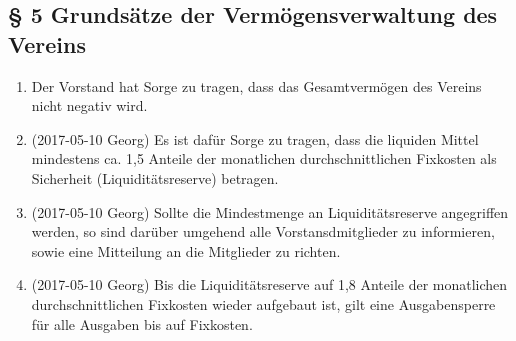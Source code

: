 \documentclass[10pt,a4paper]{article}
\begin{document}
\subsection*{§ 5 Grundsätze der Vermögensverwaltung des Vereins}
\begin{enumerate}
\item Der Vorstand hat Sorge zu tragen, dass das Gesamtvermögen des Vereins nicht negativ wird.
\item (2017-05-10 Georg) Es ist dafür Sorge zu tragen, dass die liquiden Mittel mindestens ca. 1,5 Anteile der monatlichen durchschnittlichen Fixkosten als Sicherheit (Liquiditätsreserve) betragen.
\item (2017-05-10 Georg) Sollte die Mindestmenge an Liquiditätsreserve angegriffen werden, so sind darüber umgehend alle Vorstansdmitglieder zu informieren, sowie eine Mitteilung an die Mitglieder zu richten.
\item (2017-05-10 Georg) Bis die Liquiditätsreserve auf 1,8 Anteile der monatlichen durchschnittlichen Fixkosten wieder aufgebaut ist, gilt eine Ausgabensperre für alle Ausgaben bis auf Fixkosten.
\end{enumerate}

%
%
\end{document}
